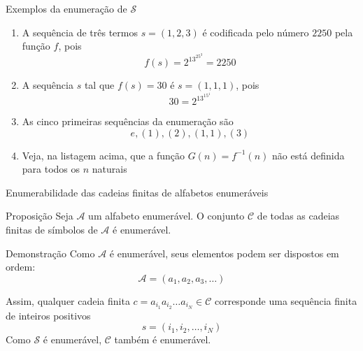 \begin{frame}[fragile]{Exemplos da enumeração de $\mathcal{S}$}

    \begin{enumerate}
        \item A sequência de três termos $s = (1, 2, 3)$ é codificada pelo número
        $2250$ pela função $f$, pois
        \[
            f(s) = 2^13^25^3 = 2250
        \]

    \item A sequência $s$ tal que $f(s) = 30$ é $s = (1, 1, 1)$, pois
        \[
            30 = 2^13^15^1
        \]

        \item As cinco primeiras sequências da enumeração são
        \[
            e, (1), (2), (1, 1), (3)
        \]

        \item Veja, na listagem acima, que a função $G(n) = f^{-1}(n)$ não está definida para
            todos os $n$ naturais
    \end{enumerate}

\end{frame}

\begin{frame}[fragile]{Enumerabilidade das cadeias finitas de alfabetos enumeráveis}

    \begin{block}{Proposição}
        Seja $\mathcal{A}$ um alfabeto enumerável. O conjunto $\mathcal{C}$ de todas as cadeias 
        finitas de símbolos de $\mathcal{A}$ é enumerável.
    \end{block}

    \begin{block}{Demonstração}
        Como $\mathcal{A}$ é enumerável, seus elementos podem ser dispostos em ordem:
        \[
            \mathcal{A} = (a_1, a_2, a_3, \ldots)
        \]

        Assim, qualquer cadeia finita $c = a_{i_1}a_{i_2}\ldots a_{i_N}\in\mathcal{C}$ 
        corresponde uma sequência finita de inteiros positivos
        \[
            s = (i_1, i_2, \ldots, i_N)
        \]
        Como $\mathcal{S}$ é enumerável, $\mathcal{C}$ também é enumerável.
    \end{block}


\end{frame}

